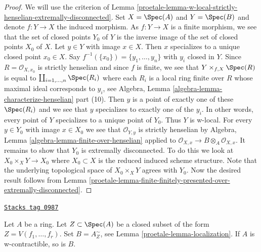 \begin{proof}

We will use the criterion of
Lemma \ref{proetale-lemma-w-local-strictly-henselian-extremally-disconnected}.
Set $X = \Spec(A)$ and $Y = \Spec(B)$ and denote $f : Y \to X$
the induced morphism.
As $f : Y \to X$ is a finite morphism, we see that the set of closed
points $Y_0$ of $Y$ is the inverse image of the set of closed points
$X_0$ of $X$. Let $y \in Y$ with image $x \in X$. Then
$x$ specializes to a unique closed point $x_0 \in X$.
Say $f^{-1}(\{x_0\}) = \{y_1, \ldots, y_n\}$ with $y_i$
closed in $Y$. Since $R = \mathcal{O}_{X, x_0}$ is strictly henselian
and since $f$ is finite, we see that $Y \times_{f, X} \Spec(R)$ is
equal to $\coprod_{i = 1, \ldots, n} \Spec(R_i)$ where
each $R_i$ is a local ring finite over $R$
whose maximal ideal corresponds to $y_i$, see
Algebra, Lemma \ref{algebra-lemma-characterize-henselian} part (10).
Then $y$ is a point of exactly one of these $\Spec(R_i)$
and we see that $y$ specializes to exactly one of the $y_i$.
In other words, every point of $Y$ specializes to a unique
point of $Y_0$. Thus $Y$ is w-local.
For every $y \in Y_0$ with image $x \in X_0$
we see that $\mathcal{O}_{Y, y}$ is strictly henselian by
Algebra, Lemma \ref{algebra-lemma-finite-over-henselian}
applied to $\mathcal{O}_{X, x} \to B \otimes_A \mathcal{O}_{X, x}$.
It remains to show that $Y_0$ is extremally disconnected.
To do this we look at $X_0 \times_X Y \to X_0$
where $X_0 \subset X$ is the reduced induced scheme structure.
Note that the underlying topological space of
$X_0 \times_X Y$ agrees with $Y_0$. Now the desired result follows from
Lemma \ref{proetale-lemma-finite-finitely-presented-over-extremally-disconnected}.
\end{proof}

\begin{lemma}
\label{proetale-lemma-localization-w-contractible}
\href{https://stacks.math.columbia.edu/tag/0987}{\texttt{Stacks tag 0987}}

Let $A$ be a ring. Let $Z \subset \Spec(A)$ be a closed subset
of the form $Z = V(f_1, \ldots, f_r)$. Set $B = A_Z^\sim$, see
Lemma \ref{proetale-lemma-localization}. If $A$ is w-contractible, so is $B$.
\end{lemma}

